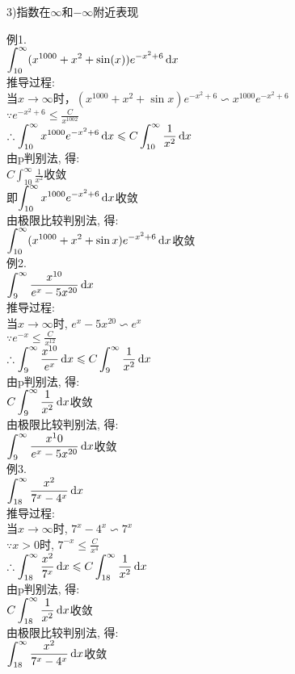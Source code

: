 3)指数在$\infty$和$-\infty$附近表现
\begin{center}
\end{center}

例1.\\
\phantom{例}$\displaystyle\int_{10}^\infty(x^{1000}+x^2+\sin(x))e^{-x^2+6}\mathop{}\!\mathrm{d} x$\\
推导过程:\\
当$x\to\infty$时，$(x^{1000}+x^2+\sin x)e^{-x^2+6}\backsim x^{1000}e^{-x^2+6}$\\
$\displaystyle\because e^{-x^2+6}\leqslant\frac{C}{x^{1002}}$\\
$\displaystyle\therefore\int_{10}^\infty x^{1000}e^{-x^2+6}\mathop{}\!\mathrm{d} x\leqslant C\int_{10}^{\infty}\frac{1}{x^2}\mathop{}\!\mathrm{d} x$\\
由p判别法, 得:\\
$\displaystyle C\int_{10}^\infty\frac{1}{x^2}$收敛\\
即$\displaystyle\int_{10}^\infty x^{1000}e^{-x^2+6}\mathop{}\!\mathrm{d} x$收敛\\
由极限比较判别法, 得:\\
$\displaystyle\int_{10}^\infty(x^{1000}+x^2+\sin x)e^{-x^2+6}\mathop{}\!\mathrm{d} x$收敛\\[1ex]

例2.\\
\phantom{例}$\displaystyle\int_9^\infty\frac{x^{10}}{e^x-5x^{20}}\mathop{}\!\mathrm{d} x$\\
推导过程:\\
当$x\to\infty$时, $e^x-5x^{20}\backsim e^x$\\
$\displaystyle\because e^{-x}\leqslant\frac{C}{x^{12}}$\\
$\displaystyle\therefore\int_9^\infty\frac{x^{10}}{e^x}\mathop{}\!\mathrm{d} x\leqslant C\int_9^\infty\frac{1}{x^2}\mathop{}\!\mathrm{d} x$\\
由p判别法, 得:\\
$\displaystyle C\int_9^\infty\frac{1}{x^2}\mathop{}\!\mathrm{d} x$收敛\\
由极限比较判别法, 得:\\
$\displaystyle\int_9^\infty\frac{x^10}{e^x-5x^{20}}\mathop{}\!\mathrm{d} x$收敛\\[1ex]

例3.\\
\phantom{例}$\displaystyle\int_{18}^\infty\frac{x^2}{7^x-4^x}\mathop{}\!\mathrm{d} x$\\
推导过程:\\
当$x\to\infty$时, $7^x-4^x\backsim 7^x$\\
$\because x>0$时, $\displaystyle 7^{-x}\leqslant\frac{C}{x^4}$\\
$\displaystyle\therefore\int_{18}^\infty\frac{x^2}{7^x}\mathop{}\!\mathrm{d} x\leqslant C\int_{18}^\infty\frac{1}{x^2}\mathop{}\!\mathrm{d} x$\\
由p判别法, 得:\\
$\displaystyle C\int_{18}^\infty\frac{1}{x^2}\mathop{}\!\mathrm{d} x$收敛\\
由极限比较判别法, 得:\\
$\displaystyle\int_{18}^\infty\frac{x^2}{7^x-4^x}\mathop{}\!\mathrm{d} x$收敛\\[2ex]

